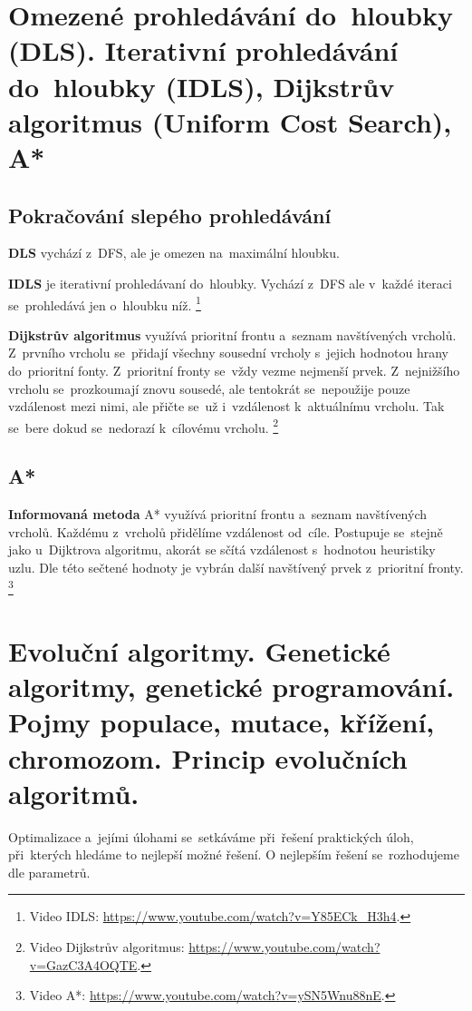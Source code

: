 \clearpage
\section{Omezené prohledávání do~hloubky (DLS). Iterativní prohledávání do~hloubky (IDLS), Dijkstrův algoritmus (Uniform Cost Search), A*}

\subsection{Pokračování slepého prohledávání}

\textbf{DLS} vychází z~DFS, ale je omezen na~maximální hloubku.

\textbf{IDLS} je iterativní prohledávaní do~hloubky. Vychází z~DFS ale v~každé iteraci se~prohledává jen o~hloubku níž.%
\footnote{Video IDLS: \url{https://www.youtube.com/watch?v=Y85ECk_H3h4}.}

\textbf{Dijkstrův algoritmus} využívá prioritní frontu a~seznam navštívených vrcholů. Z~prvního vrcholu se~přidají všechny sousední vrcholy s~jejich hodnotou hrany do~prioritní fonty. Z~prioritní fronty se~vždy vezme nejmenší prvek. Z~nejnižšího vrcholu se~prozkoumají znovu sousedé, ale tentokrát se~nepoužije pouze vzdálenost mezi nimi, ale přičte se~už i~vzdálenost k~aktuálnímu vrcholu. Tak se~bere dokud se~nedorazí k~cílovému vrcholu.%
\footnote{Video Dijkstrův algoritmus: \url{https://www.youtube.com/watch?v=GazC3A4OQTE}.}

\subsection{A*}

\textbf{Informovaná metoda} A* využívá prioritní frontu a~seznam navštívených vrcholů. Každému z~vrcholů přidělíme vzdálenost od~cíle. Postupuje se~stejně jako u~Dijktrova algoritmu, akorát se sčítá vzdálenost s~hodnotou heuristiky uzlu. Dle této sečtené hodnoty je vybrán další navštívený prvek z~prioritní fronty.%
\footnote{Video A*: \url{https://www.youtube.com/watch?v=ySN5Wnu88nE}.}

\clearpage
\section{Evoluční algoritmy. Genetické algoritmy, genetické programování. Pojmy populace, mutace, křížení, chromozom. Princip evolučních algoritmů.}

Optimalizace a~jejími úlohami se~setkáváme při~řešení praktických úloh, při~kterých hledáme to nejlepší možné řešení. O nejlepším řešení se~rozhodujeme dle parametrů.

